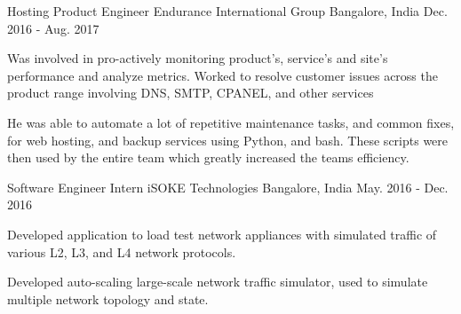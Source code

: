 \begin{cventries}
  \cventry
    {Hosting Product Engineer} %
    {Endurance International Group} %
    {Bangalore, India} %
    {Dec. 2016 - Aug. 2017} %
    {
      \begin{cvitems} %
        \item { Was involved in pro-actively monitoring product's, service's and site's performance and analyze metrics. Worked to resolve customer issues across the product range involving DNS, SMTP, CPANEL, and other services }
        \item { He was able to automate a lot of repetitive maintenance tasks, and common fixes, for web hosting, and backup services using Python, and bash. These scripts were then used by the entire team which greatly increased the teams efficiency. }
      \end{cvitems}
    }

  \cventry
    {Software Engineer Intern} %
    {iSOKE Technologies } %
    {Bangalore, India} %
    {May. 2016 - Dec. 2016} %
    {
      \begin{cvitems} %
        \item {Developed application to load test network appliances with simulated traffic of various L2, L3, and L4 network protocols.}
        \item {Developed auto-scaling large-scale network traffic simulator, used to simulate multiple network topology and state.}
      \end{cvitems}
    }
\end{cventries}
